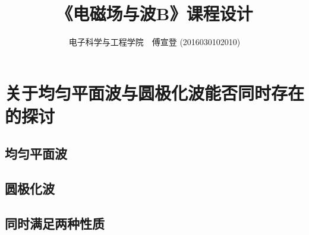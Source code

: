 \documentclass[UTF8,linespread=1.236]{ctexart}
\begin{document}
\title{《电磁场与波B》课程设计}
\author{电子科学与工程学院\ \ 傅宣登 (2016030102010)}

\maketitle

\section{关于均匀平面波与圆极化波能否同时存在的探讨}

\subsection{均匀平面波}



\subsection{圆极化波}

\subsection{同时满足两种性质}


\end{document}
